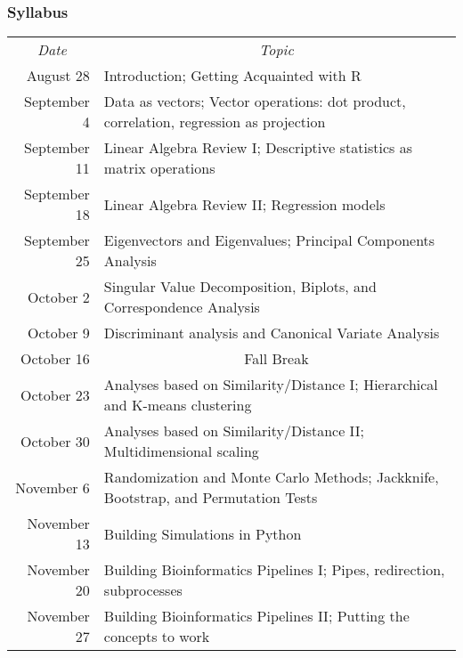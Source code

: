 \documentclass{beamer}
\begin{document}
\begin{frame}
  \frametitle{Syllabus}

\scriptsize

\renewcommand{\arraystretch}{1.1}
\begin{tabular}{rp{3.5in}}
\multicolumn{1}{c}{{\sl Date}} & \multicolumn{1}{c}{{\sl Topic}} \\
August 28 & Introduction; Getting Acquainted with R \\
September 4 & Data as vectors; Vector operations: dot product, correlation, regression as projection \\
September 11 & Linear Algebra Review I; Descriptive statistics as matrix operations \\
September 18 & Linear Algebra Review II; Regression models \\
September 25 & Eigenvectors and Eigenvalues; Principal Components Analysis \\
October 2 & Singular Value Decomposition, Biplots, and Correspondence Analysis\\
October 9 & Discriminant analysis and Canonical Variate Analysis\\
October 16 & \multicolumn{1}{c}{{\sc \alert{Fall Break}}} \\
October 23 & Analyses based on Similarity/Distance I; Hierarchical and K-means clustering\\
October 30 & Analyses based on Similarity/Distance II; Multidimensional scaling\\
November 6 & Randomization and Monte Carlo Methods; Jackknife, Bootstrap, and Permutation Tests\\
November 13 & Building Simulations in Python\\
November 20 & Building Bioinformatics Pipelines I; Pipes, redirection, subprocesses \\
November 27 & Building Bioinformatics Pipelines II; Putting the concepts to work \\


\end{tabular}

\normalsize

\end{frame}
\end{document}
